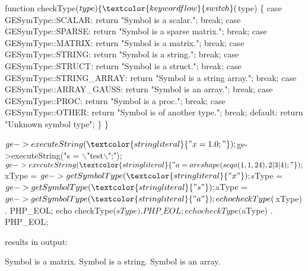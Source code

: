 \begin{DoxyCode}
\textcolor{keyword}{function} checkType($type) \{
    \textcolor{keywordflow}{switch} ($type) \{
        \textcolor{keywordflow}{case} GESymType::SCALAR:
            \textcolor{keywordflow}{return} \textcolor{stringliteral}{"Symbol is a scalar."};
            \textcolor{keywordflow}{break};
        \textcolor{keywordflow}{case} GESymType::SPARSE:
            \textcolor{keywordflow}{return} \textcolor{stringliteral}{"Symbol is a sparse matrix."};
            \textcolor{keywordflow}{break};
        \textcolor{keywordflow}{case} GESymType::MATRIX:
            \textcolor{keywordflow}{return} \textcolor{stringliteral}{"Symbol is a matrix."};
            \textcolor{keywordflow}{break};
        \textcolor{keywordflow}{case} GESymType::STRING:
            \textcolor{keywordflow}{return} \textcolor{stringliteral}{"Symbol is a string."};
            \textcolor{keywordflow}{break};
        \textcolor{keywordflow}{case} GESymType::STRUCT:
            \textcolor{keywordflow}{return} \textcolor{stringliteral}{"Symbol is a struct."};
            \textcolor{keywordflow}{break};
        \textcolor{keywordflow}{case} GESymType::STRING\_ARRAY:
            \textcolor{keywordflow}{return} \textcolor{stringliteral}{"Symbol is a string array."};
            \textcolor{keywordflow}{break};
        \textcolor{keywordflow}{case} GESymType::ARRAY\_GAUSS:
            \textcolor{keywordflow}{return} \textcolor{stringliteral}{"Symbol is an array."};
            \textcolor{keywordflow}{break};
        \textcolor{keywordflow}{case} GESymType::PROC:
            \textcolor{keywordflow}{return} \textcolor{stringliteral}{"Symbol is a proc."};
            \textcolor{keywordflow}{break};
        \textcolor{keywordflow}{case} GESymType::OTHER:
            \textcolor{keywordflow}{return} \textcolor{stringliteral}{"Symbol is of another type."};
            \textcolor{keywordflow}{break};
        \textcolor{keywordflow}{default}:
            \textcolor{keywordflow}{return} \textcolor{stringliteral}{"Unknown symbol type"};
    \}
\}

$ge->executeString(\textcolor{stringliteral}{"x = 1.0;"});
$ge->executeString(\textcolor{stringliteral}{"s = \(\backslash\)"test\(\backslash\)";"});
$ge->executeString(\textcolor{stringliteral}{"a = areshape(seqa(1, 1, 24), 2|3|4);"});

$xType = $ge->getSymbolType(\textcolor{stringliteral}{"x"});
$sType = $ge->getSymbolType(\textcolor{stringliteral}{"s"});
$aType = $ge->getSymbolType(\textcolor{stringliteral}{"a"});

echo checkType($xType) . PHP\_EOL;
echo checkType($sType) . PHP\_EOL;
echo checkType($aType) . PHP\_EOL;
\end{DoxyCode}
 results in output\-: 
\begin{DoxyCode}
Symbol is a matrix.
Symbol is a \textcolor{keywordtype}{string}.
Symbol is an array.
\end{DoxyCode}
 

